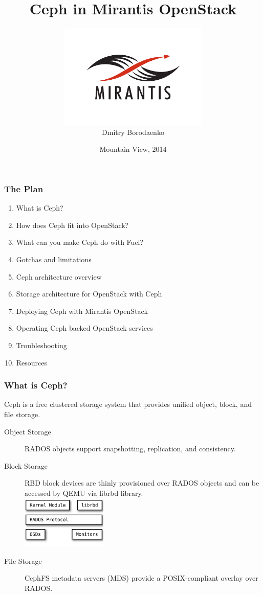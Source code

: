 \documentclass[hyperref=unicode,utf8,xcolor=pst]{beamer}
\title{\fontsize{26}{0}\selectfont Ceph in Mirantis OpenStack}
\author{\vspace{-2.5mm}\includegraphics[height=5cm]{Vector_RGB_MirantisLogo}\\Dmitry Borodaenko}
\date{Mountain View, 2014}
\begin{document}
\begin{frame}
	\titlepage
\end{frame}

\begin{frame}
	\frametitle{The Plan}
	\begin{enumerate}
		\item What is Ceph?
		\item How does Ceph fit into OpenStack?
		\item What can you make Ceph do with Fuel?
		\item Gotchas and limitations
		\item Ceph architecture overview
		\item Storage architecture for OpenStack with Ceph
		\item Deploying Ceph with Mirantis OpenStack
		\item Operating Ceph backed OpenStack services
		\item Troubleshooting
		\item Resources
	\end{enumerate}
\end{frame}

\begin{frame}
	\setcounter{framenumber}{1}
	\frametitle{What is Ceph?}
	Ceph is a free clustered storage system that provides unified
	object, block, and file storage.

	\begin{description}
		\item[Object Storage] RADOS objects support
			snapshotting, replication, and consistency.
		\item[Block Storage] RBD block devices are thinly
			provisioned over RADOS objects and can be
			accessed by QEMU via librbd library.\\
			\includegraphics[height=2.5cm]{ceph-rbd}
		\item[File Storage] CephFS metadata servers (MDS)
			provide a POSIX-compliant overlay over RADOS.
	\end{description}
\end{frame}
\end{document}
